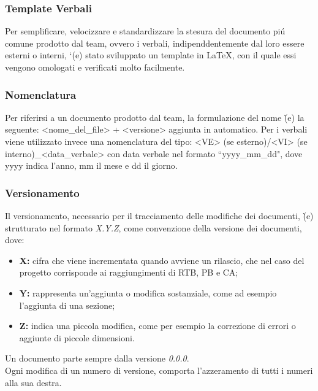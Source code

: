 \begin{itemize}
\subsubsection{Template Verbali}
Per semplificare, velocizzare e standardizzare la stesura del documento piú comune prodotto dal team, ovvero i verbali, indipenddentemente dal loro essere esterni o interni, `(e) stato sviluppato un template in \LaTeX, con il quale essi vengono omologati e verificati molto facilmente.

\subsubsection{Nomenclatura}
Per riferirsi a un documento prodotto dal team, la formulazione del nome \`(e) la seguente: <nome_del_file> + <versione> aggiunta in automatico. Per i verbali viene utilizzato invece una nomenclatura del tipo: <VE> (se esterno)/<VI> (se interno)_<data_verbale> con data verbale nel formato ``yyyy_mm_dd", dove yyyy indica l'anno, mm il mese e dd il giorno. 

\subsubsection{Versionamento}
Il versionamento, necessario per il tracciamento delle modifiche dei documenti, \`(e) strutturato nel formato \textit{X.Y.Z}, come convenzione della versione dei documenti, dove:
\begin{itemize}
    \item \textbf{X:} cifra che viene incrementata quando avviene un rilascio, che nel caso del progetto corrisponde ai raggiungimenti di RTB, PB e CA;
    \item \textbf{Y:} rappresenta un'aggiunta o modifica sostanziale, come ad esempio l'aggiunta di una sezione;
    \item \textbf{Z:} indica una piccola modifica, come per esempio la correzione di errori o aggiunte di piccole dimensioni.
\end{itemize}
Un documento parte sempre dalla versione \textit{0.0.0}. \\
Ogni modifica di un numero di versione, comporta l'azzeramento di tutti i numeri alla sua destra.


\end{itemize}
